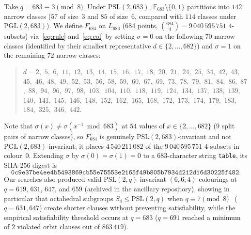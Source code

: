 \documentclass[11pt]{article}
\theoremstyle{remark}
\newcommand{\F}{\mathbb{F}}
\begin{document}
Take $q=683\equiv 3\pmod 8$. Under $\mathrm{PSL}(2,683)$,
$\F_{683}\setminus\{0,1\}$ partitions into $142$ narrow classes ($57$ of
size~$3$ and $85$ of size~$6$, compared with $114$ classes under
$\mathrm{PGL}(2,683)$). We define $F_{684}$ on $L_{683}$ ($684$ points,
$\binom{684}{4}=9\,040\,595\,751$ $4$-subsets) via~\eqref{eq:rule}
and~\eqref{eq:col} by setting $\sigma=0$ on the following $70$ narrow classes
(identified by their smallest representative $d\in\{2,\dots,682\}$) and
$\sigma=1$ on the remaining $72$ narrow classes:
\begin{quote}
\small\raggedright
$d = 2$,\allowbreak\ $5$,\allowbreak\ $6$,\allowbreak\ $11$,\allowbreak\ $12$,\allowbreak\ $13$,\allowbreak\ $14$,\allowbreak\ $15$,\allowbreak\ $16$,\allowbreak\ $17$,\allowbreak\ $18$,\allowbreak\ $20$,\allowbreak\ $21$,\allowbreak\ $24$,\allowbreak\ $25$,\allowbreak\ $34$,\allowbreak\ $42$,\allowbreak\ $43$,\allowbreak\ $45$,\allowbreak\ $46$,\allowbreak\ $48$,\allowbreak\ $49$,\allowbreak\ $52$,\allowbreak\ $53$,\allowbreak\ $56$,\allowbreak\ $58$,\allowbreak\ $59$,\allowbreak\ $60$,\allowbreak\ $67$,\allowbreak\ $69$,\allowbreak\ $73$,\allowbreak\ $78$,\allowbreak\ $79$,\allowbreak\ $81$,\allowbreak\ $84$,\allowbreak\ $86$,\allowbreak\ $87$,\allowbreak\ $88$,\allowbreak\ $94$,\allowbreak\ $96$,\allowbreak\ $97$,\allowbreak\ $98$,\allowbreak\ $103$,\allowbreak\ $104$,\allowbreak\ $110$,\allowbreak\ $118$,\allowbreak\ $119$,\allowbreak\ $124$,\allowbreak\ $134$,\allowbreak\ $137$,\allowbreak\ $138$,\allowbreak\ $139$,\allowbreak\ $140$,\allowbreak\ $141$,\allowbreak\ $145$,\allowbreak\ $146$,\allowbreak\ $148$,\allowbreak\ $152$,\allowbreak\ $162$,\allowbreak\ $165$,\allowbreak\ $168$,\allowbreak\ $172$,\allowbreak\ $173$,\allowbreak\ $174$,\allowbreak\ $179$,\allowbreak\ $183$,\allowbreak\ $184$,\allowbreak\ $325$,\allowbreak\ $346$,\allowbreak\ $442$.
\par
\end{quote}
Note that $\sigma(x)\ne\sigma(x^{-1}\bmod 683)$ at $54$ values of
$x\in\{2,\dots,682\}$ ($9$ split pairs of narrow classes), so $F_{684}$ is
genuinely $\mathrm{PSL}(2,683)$-invariant and not $\mathrm{PGL}(2,683)$-invariant;
it places $4\,540\,211\,082$ of the $9\,040\,595\,751$ $4$-subsets in colour~$0$.
Extending $\sigma$ by $\sigma(0)=\sigma(1)=0$ to a $683$-character string
\texttt{table}, its SHA-256 digest is
\[
  \texttt{0c9e37be4ee4b5493869cb55e75553e2165f49b805b7934d212d16d30225f482}.
\]
Our searches also produced valid $\mathrm{PSL}(2,q)$-invariant $(6,6;4)$-colourings
at $q=619$, $631$, $647$, and $659$ (archived in the ancillary repository),
showing in particular that octahedral subgroups $S_4\le\mathrm{PSL}(2,q)$ when
$q\equiv 7\pmod 8$~\cite{dickson} ($q=631,647$) create shorter clauses without
preventing satisfiability, while the empirical satisfiability threshold occurs
at $q=683$ ($q=691$ reached a minimum of $2$ violated orbit clauses out of
$863\,419$).
\end{document}
